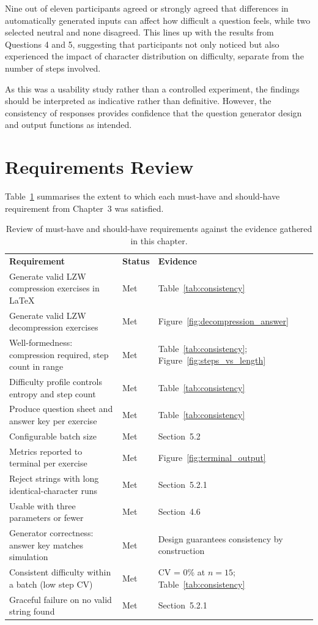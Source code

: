 \documentclass{l4proj}
\begin{document}
Nine out of eleven participants agreed or strongly agreed that differences in automatically generated inputs can affect how difficult a question feels, while two selected neutral and none disagreed. This lines up with the results from Questions 4 and 5, suggesting that participants not only noticed but also experienced the impact of character distribution on difficulty, separate from the number of steps involved.

As this was a usability study rather than a controlled experiment, the findings should be interpreted as indicative rather than definitive. However, the consistency of responses provides  confidence that the question generator design and output functions as intended.

\section{Requirements Review}

Table~\ref{tab:requirements_review} summarises the extent to which each
must-have and should-have requirement from Chapter~3 was satisfied.

\begin{table}[htb]
\caption{Review of must-have and should-have requirements against the
evidence gathered in this chapter.}
\label{tab:requirements_review}
\begin{tabular}{@{}p{7cm}p{2cm}p{4cm}@{}}
\textbf{Requirement} & \textbf{Status} & \textbf{Evidence} \\
Generate valid LZW compression exercises in LaTeX & Met &
    Table~\ref{tab:consistency} \\
Generate valid LZW decompression exercises & Met &
    Figure~\ref{fig:decompression_answer} \\
Well-formedness: compression required, step count in range & Met &
    Table~\ref{tab:consistency}; Figure~\ref{fig:steps_vs_length} \\
Difficulty profile controls entropy and step count & Met &
    Table~\ref{tab:consistency} \\
Produce question sheet and answer key per exercise & Met &
    Table~\ref{tab:consistency} \\
Configurable batch size & Met & Section~5.2 \\
Metrics reported to terminal per exercise & Met & Figure~\ref{fig:terminal_output} \\
Reject strings with long identical-character runs & Met & Section~5.2.1 \\
Usable with three parameters or fewer & Met & Section~4.6 \\
Generator correctness: answer key matches simulation & Met &
    Design guarantees consistency by construction \\
Consistent difficulty within a batch (low step CV) & Met &
    CV = 0\% at $n=15$; Table~\ref{tab:consistency} \\
Graceful failure on no valid string found & Met & Section~5.2.1 \\
\end{tabular}
\end{table}
\end{document}
